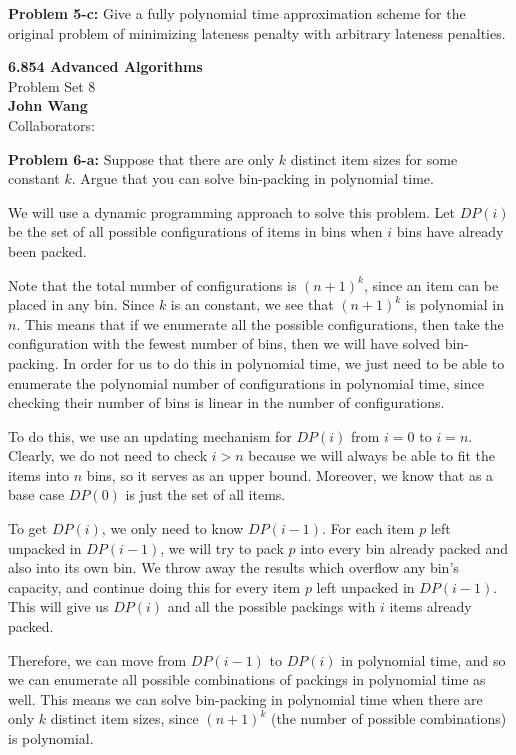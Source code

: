 \documentclass[psamsfonts]{amsart}
\newenvironment{sol}{\vspace{0.25cm}{\large \bfseries Solution:}}{\qedsymbol}
\newenvironment{prob}[1]{\begin{framed}{\large \bfseries Problem #1:}}{\end{framed}}
\newcommand{\makenewtitle}{
    \begin{center}
    {\huge \bfseries 6.854 Advanced Algorithms} \\
    Problem Set 8\\
    \vspace{0.25cm}
    {\bfseries John Wang} \\
    Collaborators:  
    \end{center}
    \vspace{0.5cm}
}
\begin{document}
\begin{prob}{5-c}
Give a fully polynomial time approximation scheme for the original problem of minimizing lateness penalty with arbitrary lateness penalties.
\end{prob}
\begin{sol}

\end{sol}

\newpage
\makenewtitle

\begin{prob}{6-a}
Suppose that there are only $k$ distinct item sizes for some constant $k$. Argue that you can solve bin-packing in polynomial time.
\end{prob}
\begin{sol}
We will use a dynamic programming approach to solve this problem. Let $DP(i)$ be the set of all possible configurations of items in bins when $i$ bins have already been packed. 

Note that the total number of configurations is $(n+1)^k$, since an item can be placed in any bin. Since $k$ is an constant, we see that $(n+1)^k$ is polynomial in $n$. This means that if we enumerate all the possible configurations, then take the configuration with the fewest number of bins, then we will have solved bin-packing. In order for us to do this in polynomial time, we just need to be able to enumerate the polynomial number of configurations in polynomial time, since checking their number of bins is linear in the number of configurations.

To do this, we use an updating mechanism for $DP(i)$ from $i=0$ to $i=n$. Clearly, we do not need to check $i > n$ because we will always be able to fit the items into $n$ bins, so it serves as an upper bound. Moreover, we know that as a base case $DP(0)$ is just the set of all items. 

To get $DP(i)$, we only need to know $DP(i-1)$. For each item $p$ left unpacked in $DP(i-1)$, we will try to pack $p$ into every bin already packed and also into its own bin. We throw away the results which overflow any bin's capacity, and continue doing this for every item $p$ left unpacked in $DP(i-1)$. This will give us $DP(i)$ and all the possible packings with $i$ items already packed.

Therefore, we can move from $DP(i-1)$ to $DP(i)$ in polynomial time, and so we can enumerate all possible combinations of packings in polynomial time as well. This means we can solve bin-packing in polynomial time when there are only $k$ distinct item sizes, since $(n+1)^k$ (the number of possible combinations) is polynomial.
\end{sol}
\end{document}
